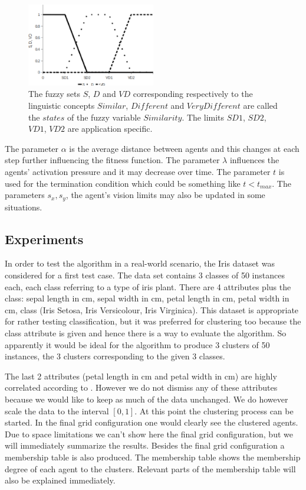 \begin{figure}[h!]
  \centering
  \includegraphics[width=0.5\textwidth]{similarity}
  \caption[The fuzzy variable Similarity]{The fuzzy sets $S$, $D$ and $VD$ corresponding respectively to the linguistic concepts $Similar$, $Different$ and $Very Different$ are called the $states$ of the fuzzy variable  $Similarity$. The limits $SD1$, $SD2$, $VD1$, $VD2$ are application specific.}
  \label{fig:similarity}
\end{figure}

The parameter $\alpha$ is the average distance  between agents and this changes at each step further influencing the fitness function. The parameter $\lambda$ influences the agents' activation pressure and it may decrease over time. The parameter $t$ is used for the  termination condition which could be something like \begin{math} t < t_{max}  \end{math}. The parameters $s_x, s_y$, the agent's vision limits may also be updated in some situations.  

\subsection{Experiments}
\label{sec:experiments}

In order to test the algorithm in a real-world scenario, the Iris dataset \cite{website:iris} was considered for a first test case. The data set contains 3 classes of 50 instances each, each class referring to a type of iris plant. There are 4 attributes plus the class: sepal length in cm, sepal width in cm, petal length in cm, petal width in cm, class (Iris Setosa, Iris Versicolour, Iris Virginica). This dataset is appropriate for rather testing classification, but it was preferred for clustering too because the class attribute is given and hence there is a way to evaluate the algorithm. So apparently it would be ideal for the algorithm to produce 3 clusters of 50 instances, the 3 clusters corresponding to the given 3 classes. 

The last 2 attributes (petal length in cm and petal width in cm) are highly correlated according to \cite{website:iris}. However we do not dismiss any of these attributes because we would like to keep as much of the data unchanged. We do however scale the data to the interval $[0, 1]$. At this point the clustering process can be started. In the final grid configuration one would clearly see the clustered agents. Due to space limitations we can't show here the final grid configuration, but we will immediately summarize the results.
Besides the final grid configuration a membership table is also produced. The membership table shows the membership degree of each agent to the clusters. Relevant parts of the membership table will also be explained immediately. 

